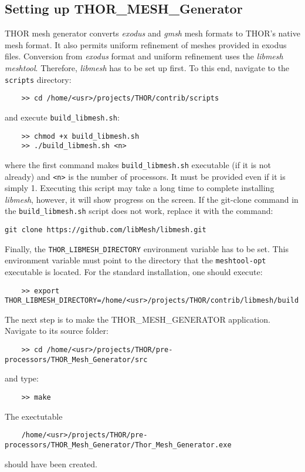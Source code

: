\subsection{Setting up THOR\_MESH\_Generator}
THOR mesh generator converts \textit{exodus} and \textit{gmsh} 
mesh formats to THOR's native mesh format. It also permits
uniform refinement of meshes provided in exodus files. Conversion from \textit{exodus} format and uniform refinement uses the 
\textit{libmesh}~\cite{libMeshPaper} \textit{meshtool}. Therefore, 
\textit{libmesh} has to be set up first. To this end, navigate to the \verb"scripts" directory:
\begin{verbatim}
    >> cd /home/<usr>/projects/THOR/contrib/scripts
\end{verbatim}
and execute \verb"build_libmesh.sh":
\begin{verbatim}
    >> chmod +x build_libmesh.sh
    >> ./build_libmesh.sh <n>
\end{verbatim}
where the first command makes \verb"build_libmesh.sh" executable (if it is not already) and \verb"<n>" is the number of processors. It must be provided even if it is simply 1. Executing this script may take a long time to complete installing \textit{libmesh}, however, it will show progress on the screen. If the git-clone command in the \verb"build_libmesh.sh" script does not work, replace it with the command:
\begin{verbatim}
git clone https://github.com/libMesh/libmesh.git
\end{verbatim}
Finally, the \verb"THOR_LIBMESH_DIRECTORY" environment variable has to be set. This environment variable must point to the directory that the \verb"meshtool-opt" executable is located. For the standard installation, one should execute:
\begin{verbatim}
    >> export THOR_LIBMESH_DIRECTORY=/home/<usr>/projects/THOR/contrib/libmesh/build
\end{verbatim}

The next step is to make the THOR\_MESH\_GENERATOR application. Navigate to its source folder:
\begin{verbatim}
    >> cd /home/<usr>/projects/THOR/pre-processors/THOR_Mesh_Generator/src
\end{verbatim}
and type:
\begin{verbatim}
    >> make
\end{verbatim}
The exectutable
\begin{verbatim}
    /home/<usr>/projects/THOR/pre-processors/THOR_Mesh_Generator/Thor_Mesh_Generator.exe
\end{verbatim}
should have been created.

